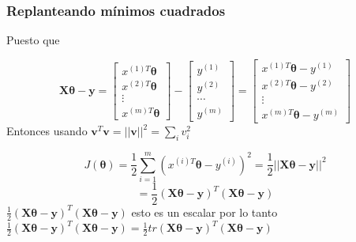 \documentclass{beamer}
\begin{document}
\begin{frame}
\frametitle{Replanteando mínimos cuadrados }
Puesto que 

\begin{equation*}
\boldsymbol{X\theta}-\boldsymbol{y}=  \begin{bmatrix} x^{(1)T}\boldsymbol{\theta} \\ x^{(2)T }\boldsymbol{\theta}\\ \vdots \\ x^{(m)T}\boldsymbol{\theta}   \end{bmatrix} - \begin{bmatrix} y^{(1)} \\ y^{(2)} \\ \cdots \\ y^{(m)}   \end{bmatrix}=  \begin{bmatrix} x^{(1)T}\boldsymbol{\theta}- y^{(1)}\\ x^{(2)T }\boldsymbol{\theta}-  y^{(2)}\\ \vdots \\ x^{(m)T}\boldsymbol{\theta}- y^{(m)}   \end{bmatrix}
\end{equation*}
Entonces usando $\boldsymbol{v}^T \boldsymbol{v}= \vert\vert \boldsymbol{v} \vert\vert ^{2}= \sum_{i}v_i^2 $

\begin{equation*}
J(\boldsymbol{\theta})= \frac{1}{2} \sum_{i=1}^{m}{(x^{(i)T}\boldsymbol{\theta} - y^{(i)})^2} =\frac{1}{2}\vert\vert \boldsymbol{X\theta}- \boldsymbol{y}\vert\vert^{2}
\end{equation*} 
\begin{equation*}
=\frac{1}{2} (\boldsymbol{X\theta}- \boldsymbol{y})^{T} (\boldsymbol{X\theta}- \boldsymbol{y})
\end{equation*}
 $\frac{1}{2} (\boldsymbol{X\theta}- \boldsymbol{y})^{T} (\boldsymbol{X\theta}- \boldsymbol{y})$ esto es un escalar por lo tanto $\frac{1}{2} (\boldsymbol{X\theta}- \boldsymbol{y})^{T} (\boldsymbol{X\theta}- \boldsymbol{y})= \frac{1}{2} tr (\boldsymbol{X\theta}- \boldsymbol{y})^{T} (\boldsymbol{X\theta}- \boldsymbol{y})$
\end{frame}
\end{document}
